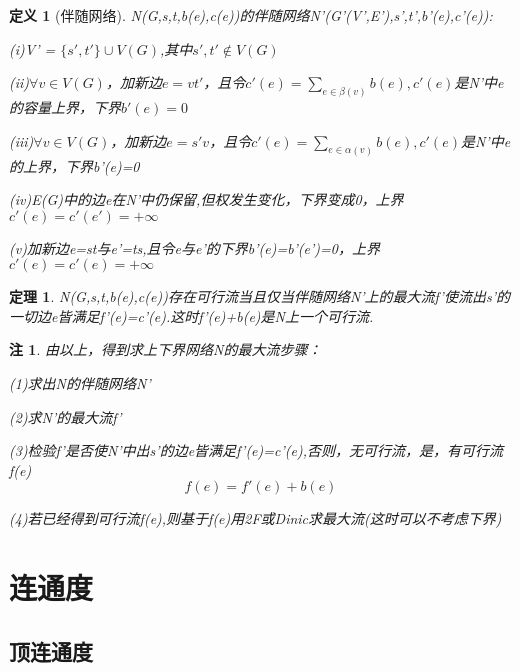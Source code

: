 \documentclass[UTF8]{ctexart}
\newtheorem{dfnt}{定义}
\newtheorem{thr}{定理}
\newtheorem*{note}{注}
\begin{document}
\begin{dfnt}[伴随网络]
N(G,s,t,b(e),c(e))的伴随网络N'(G'(V',E'),s',t',b'(e),c'(e)):
\item (i)V' = $\{s',t'\}\cup V(G)$,其中$s',t' \notin V(G)$
\item (ii)$\forall v \in V(G)$，加新边$e=vt'$，且令$c'(e)=\sum \limits_{e \in \beta(v)}b(e),c'(e)$是N'中e的容量上界，下界$b'(e)=0$
\item (iii)$\forall v \in V(G)$，加新边$e=s'v$，且令$c'(e)=\sum \limits_{e \in \alpha(v)}b(e),c'(e)$是N'中e的上界，下界b'(e)=0
\item (iv)E(G)中的边e在N'中仍保留,但权发生变化，下界变成0，上界$c'(e)=c'(e')=+\infty$
\item (v)加新边e=st与e'=ts,且令e与e'的下界b'(e)=b'(e')=0，上界$c'(e)=c'(e)=+\infty$
\end{dfnt}
\begin{thr}
N(G,s,t,b(e),c(e))存在可行流当且仅当伴随网络N'上的最大流f'使流出s'的一切边e皆满足f'(e)=c'(e).这时f'(e)+b(e)是N上一个可行流.
\end{thr}
\begin{note}
由以上，得到求上下界网络N的最大流步骤：
\item (1)求出N的伴随网络N'
\item (2)求N'的最大流f'
\item (3)检验f'是否使N'中出s'的边e皆满足f'(e)=c'(e),否则，无可行流，是，有可行流f(e)$$f(e)=f'(e)+b(e)$$
\item (4)若已经得到可行流f(e),则基于f(e)用2F或Dinic求最大流(这时可以不考虑下界)
\end{note}
\section{连通度}
\subsection{顶连通度}
\end{document}
